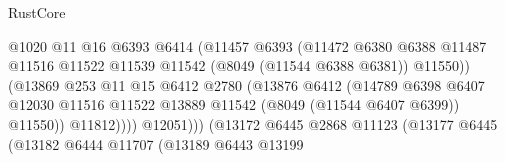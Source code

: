 \begin{lexlean}{RustCore}
\begin{coremodule}
                                              @1020
                                              @11
                                              @16
                                              @6393
                                              @6414
                                              (@11457
                                                @6393
                                                (@11472
                                                  @6380
                                                  @6388
                                                  @11487
                                                  @11516
                                                  @11522
                                                  @11539
                                                  @11542
                                                  (@8049 (@11544 @6388 @6381))
                                                  @11550))
                                              (@13869
                                                @253
                                                @11
                                                @15
                                                @6412
                                                @2780
                                                (@13876
                                                  @6412
                                                  (@14789
                                                    @6398
                                                    @6407
                                                    @12030
                                                    @11516
                                                    @11522
                                                    @13889
                                                    @11542
                                                    (@8049 (@11544 @6407 @6399))
                                                    @11550))
                                                @11812))))
                                        @12051)))
                                  (@13172
                                    @6445
                                    @2868
                                    @11123
                                    (@13177
                                      @6445
                                      (@13182
                                        @6444
                                        @11707
                                        (@13189
                                          @6443
                                          @13199

\end{coremodule}
\end{lexlean}
